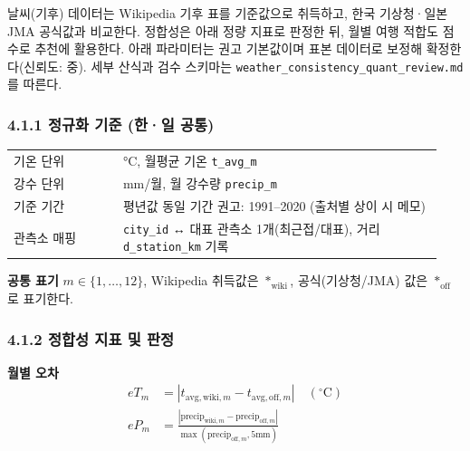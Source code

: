 \documentclass[12pt,a4paper]{article}
\newcommand{\DocNeedspace}[1]{\par\ifdim\dimexpr\pagegoal-\pagetotal\relax<#1\newpage\fi}
\begin{document}
\DocNeedspace{5\baselineskip}
날씨(기후) 데이터는 Wikipedia 기후 표를 기준값으로 취득하고, 한국 기상청·일본 JMA 공식값과 비교한다.
정합성은 아래 정량 지표로 판정한 뒤, 월별 여행 적합도 점수로 추천에 활용한다.
아래 파라미터는 권고 기본값이며 표본 데이터로 보정해 확정한다(신뢰도: 중).
세부 산식과 검수 스키마는 \texttt{weather\_\allowbreak{}consistency\_\allowbreak{}quant\_\allowbreak{}review.\allowbreak{}md}를 따른다.


\DocNeedspace{5\baselineskip}
\subsubsection*{4.1.1 정규화 기준 (한·일 공통)}


\DocNeedspace{14\baselineskip}
\begin{small}
\begin{longtable}{@{}>{\centering\arraybackslash}m{0.240\linewidth}>{\RaggedRight\arraybackslash}m{0.700\linewidth}@{}}
\toprule
\multicolumn{1}{>{\centering\arraybackslash}m{0.240\linewidth}}{\textbf{항목}} & \multicolumn{1}{>{\centering\arraybackslash}m{0.700\linewidth}}{\textbf{기준}} \\
\midrule
\endhead
기온 단위 & °C, 월평균 기온 \texttt{t\_\allowbreak{}avg\_\allowbreak{}m} \\
강수 단위 & mm/월, 월 강수량 \texttt{precip\_\allowbreak{}m} \\
기준 기간 & 평년값 동일 기간 권고: 1991–2020 (출처별 상이 시 메모) \\
관측소 매핑 & \texttt{city\_\allowbreak{}id} ↔ 대표 관측소 1개(최근접/대표), 거리 \texttt{d\_\allowbreak{}station\_\allowbreak{}km} 기록 \\
\bottomrule
\end{longtable}
\end{small}


\DocNeedspace{5\baselineskip}
\noindent\textbf{공통 표기}\quad
$m \in \{1,\ldots,12\}$,
Wikipedia 취득값은 $*_{\mathrm{wiki}}$,
공식(기상청/JMA) 값은 $*_{\mathrm{off}}$로 표기한다.


\newpage
\DocNeedspace{5\baselineskip}
\subsubsection*{4.1.2 정합성 지표 및 판정}


\DocNeedspace{16\baselineskip}
\noindent\textbf{월별 오차}
\[
\begin{aligned}
eT_m &= \left| t_{\mathrm{avg,wiki},m} - t_{\mathrm{avg,off},m} \right| \quad (^\circ\mathrm{C})\\
eP_m &= \frac{\left| \mathrm{precip}_{\mathrm{wiki},m} - \mathrm{precip}_{\mathrm{off},m} \right|}
              {\max(\mathrm{precip}_{\mathrm{off},m}, 5\mathrm{mm})}
\end{aligned}
\]
\end{document}
